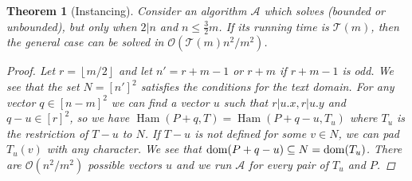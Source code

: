 \documentclass[11pt]{article}
\renewcommand{\O}{\mathcal{O}}
\newcommand{\floor}[1]{\left\lfloor #1 \right\rfloor}
\theoremstyle{plain}
\newtheorem{theorem}{Theorem}
\theoremstyle{definition}
\theoremstyle{remark}
\DeclareMathOperator*{\Ham}{Ham}
\begin{document}
\begin{theorem}[Instancing]\label{instancing}
	Consider an algorithm $\mathcal{A}$ which solves \HD (bounded or unbounded), but only when $2|n$ and $n \le \frac{3}{2}m$.
	If its running time is $\mathcal{T}(m)$, then the general case can be solved in $\O(\mathcal{T}(m) n^2 / m^2)$.
	\begin{proof}
		Let $r = \floor{m / 2}$ and let $n' = r + m - 1$ or $r + m$ if $r + m - 1$ is odd.
		We see that the set $N = [n']^2$ satisfies the conditions for the text domain.
		For any vector $q \in [n - m]^2$ we can find a vector $u$ such that $r|u.x, r|u.y$ and $q - u \in [r]^2$,
		so we have $\Ham(P + q, T) = \Ham(P + q - u, T_u)$ where $T_u$ is the restriction of $T - u$ to $N$.
		If $T - u$ is not defined for some $v \in N$, we can pad $T_u(v)$ with any character.
		We see that $\operatorname*{dom}(P + q - u) \subseteq N = \operatorname*{dom}(T_u)$.
		There are $\O(n^2 / m^2)$ possible vectors $u$ and we run $\mathcal{A}$ for every pair of $T_u$ and $P$.
	\end{proof}
\end{theorem}
\end{document}

